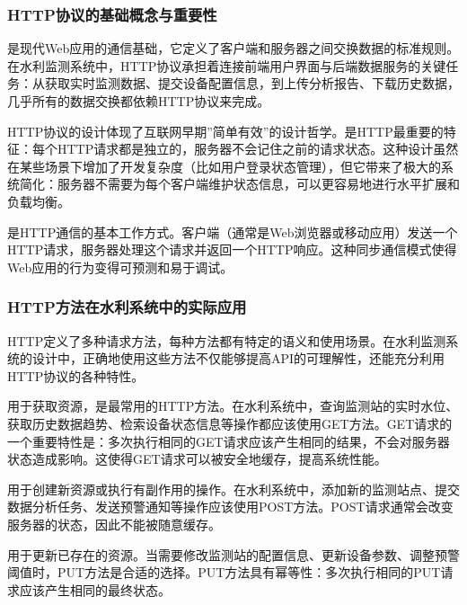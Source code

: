 \hypertarget{httpux534fux8baeux7684ux57faux7840ux6982ux5ff5ux4e0eux91cdux8981ux6027}{%
\subsubsection{HTTP协议的基础概念与重要性}\label{httpux534fux8baeux7684ux57faux7840ux6982ux5ff5ux4e0eux91cdux8981ux6027}}

是现代Web应用的通信基础，它定义了客户端和服务器之间交换数据的标准规则。在水利监测系统中，HTTP协议承担着连接前端用户界面与后端数据服务的关键任务：从获取实时监测数据、提交设备配置信息，到上传分析报告、下载历史数据，几乎所有的数据交换都依赖HTTP协议来完成。

HTTP协议的设计体现了互联网早期''简单有效''的设计哲学。是HTTP最重要的特征：每个HTTP请求都是独立的，服务器不会记住之前的请求状态。这种设计虽然在某些场景下增加了开发复杂度（比如用户登录状态管理），但它带来了极大的系统简化：服务器不需要为每个客户端维护状态信息，可以更容易地进行水平扩展和负载均衡。

是HTTP通信的基本工作方式。客户端（通常是Web浏览器或移动应用）发送一个HTTP请求，服务器处理这个请求并返回一个HTTP响应。这种同步通信模式使得Web应用的行为变得可预测和易于调试。

\hypertarget{httpux65b9ux6cd5ux5728ux6c34ux5229ux7cfbux7edfux4e2dux7684ux5b9eux9645ux5e94ux7528}{%
\subsubsection{HTTP方法在水利系统中的实际应用}\label{httpux65b9ux6cd5ux5728ux6c34ux5229ux7cfbux7edfux4e2dux7684ux5b9eux9645ux5e94ux7528}}

HTTP定义了多种请求方法，每种方法都有特定的语义和使用场景。在水利监测系统的设计中，正确地使用这些方法不仅能够提高API的可理解性，还能充分利用HTTP协议的各种特性。

用于获取资源，是最常用的HTTP方法。在水利系统中，查询监测站的实时水位、获取历史数据趋势、检索设备状态信息等操作都应该使用GET方法。GET请求的一个重要特性是：多次执行相同的GET请求应该产生相同的结果，不会对服务器状态造成影响。这使得GET请求可以被安全地缓存，提高系统性能。

用于创建新资源或执行有副作用的操作。在水利系统中，添加新的监测站点、提交数据分析任务、发送预警通知等操作应该使用POST方法。POST请求通常会改变服务器的状态，因此不能被随意缓存。

用于更新已存在的资源。当需要修改监测站的配置信息、更新设备参数、调整预警阈值时，PUT方法是合适的选择。PUT方法具有幂等性：多次执行相同的PUT请求应该产生相同的最终状态。

